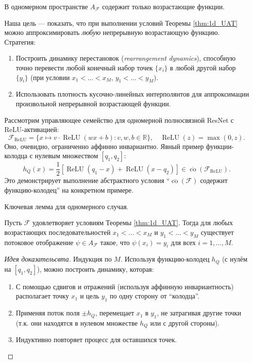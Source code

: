 \documentclass[../NDCNNAI_main.tex]{subfiles}
\begin{document}
\begin{remark}
В одномерном пространстве $A_{\mathcal{F}}$ содержит только возрастающие функции.    
\end{remark}

Наша цель --- показать, что при выполнении условий Теоремы \ref{thm:1d_UAT} можно аппроксимировать \emph{любую} непрерывную возрастающую функцию.
Стратегия:
\begin{enumerate}
    \item Построить динамику перестановок (\emph{rearrangement dynamics}), способную точно перевести любой конечный набор точек $\{x_i\}$ в любой другой набор $\{y_i\}$ (при условии $x_1 < \ldots < x_M$, $y_1 < \ldots < y_M$).
    \item Использовать плотность кусочно-линейных интерполянтов для аппроксимации произвольной непрерывной возрастающей функции.
\end{enumerate}

\begin{example}
    Рассмотрим управляющее семейство для одномерной полносвязной ResNet с ReLU-активацией:
    \[
    \mathcal{F}_{\text{ReLU}} = \{ x \mapsto v \cdot \operatorname{ReLU}(wx + b) : v, w, b \in \mathbb{R} \}, \quad \operatorname{ReLU}(z) = \max(0, z).
    \]
    Оно, очевидно, ограниченно аффинно инвариантно. Явный пример функции-колодца с нулевым множеством $[q_1, q_2]$:
    \[
    h_Q(x) = \frac{1}{2} \left[ \operatorname{ReLU}(q_1 - x) + \operatorname{ReLU}(x - q_2) \right] \in \overline{\operatorname{co}}(\mathcal{F}_{\text{ReLU}}).
    \]
    Это демонстрирует выполнение абстрактного условия ``$\overline{\operatorname{co}}(\mathcal{F})$ содержит функцию-колодец'' на конкретном примере.    
\end{example}

Ключевая лемма для одномерного случая.
\begin{lemma}
\label{lem:finite_interp_1d}
Пусть $\mathcal{F}$ удовлетворяет условиям Теоремы \ref{thm:1d_UAT}. Тогда для любых возрастающих последовательностей $x_1 < \ldots < x_M$ и $y_1 < \ldots < y_M$ существует потоковое отображение $\psi \in A_{\mathcal{F}}$ такое, что $\psi(x_i) = y_i$ для всех $i=1,\ldots,M$.
\end{lemma}
\begin{proof}[Идея доказательсвта]
Индукция по $M$. Используя функцию-колодец $h_Q$ (с нулём на $[q_1, q_2]$), можно построить динамику, которая:
\begin{enumerate}
    \item С помощью сдвигов и отражений (используя аффинную инвариантность) располагает точку $x_1$ и цель $y_1$ по одну сторону от ``колодца''.
    \item Применяя поток поля $\pm h_Q$, перемещает $x_1$ в $y_1$, не затрагивая другие точки (т.к. они находятся в нулевом множестве $h_Q$ или с другой стороны).
    \item Индуктивно повторяет процесс для оставшихся точек.
\end{enumerate}
\end{proof}
\end{document}
